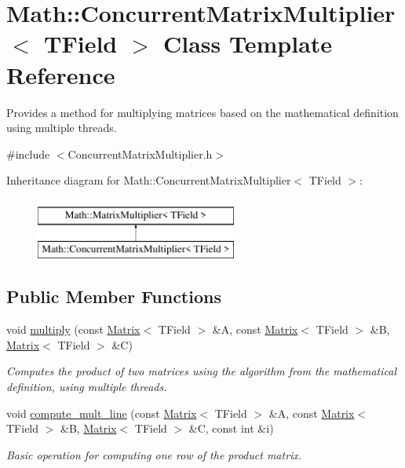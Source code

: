 \hypertarget{classMath_1_1ConcurrentMatrixMultiplier}{}\section{Math\+:\+:Concurrent\+Matrix\+Multiplier$<$ T\+Field $>$ Class Template Reference}
\label{classMath_1_1ConcurrentMatrixMultiplier}


Provides a method for multiplying matrices based on the mathematical definition using multiple threads.  




{\ttfamily \#include $<$Concurrent\+Matrix\+Multiplier.\+h$>$}

Inheritance diagram for Math\+:\+:Concurrent\+Matrix\+Multiplier$<$ T\+Field $>$\+:\begin{figure}[H]
\begin{center}
\leavevmode
\includegraphics[height=2.000000cm]{classMath_1_1ConcurrentMatrixMultiplier}
\end{center}
\end{figure}
\subsection*{Public Member Functions}
\begin{DoxyCompactItemize}
\item 
void \mbox{\hyperlink{classMath_1_1ConcurrentMatrixMultiplier_aff05c55c52bf7b9fb58b5a52d5247e7d}{multiply}} (const \mbox{\hyperlink{classMath_1_1Matrix}{Matrix}}$<$ T\+Field $>$ \&A, const \mbox{\hyperlink{classMath_1_1Matrix}{Matrix}}$<$ T\+Field $>$ \&B, \mbox{\hyperlink{classMath_1_1Matrix}{Matrix}}$<$ T\+Field $>$ \&C)
\begin{DoxyCompactList}\small\item\em Computes the product of two matrices using the algorithm from the mathematical definition, using multiple threads. \end{DoxyCompactList}\item 
void \mbox{\hyperlink{classMath_1_1ConcurrentMatrixMultiplier_ac6ab99958d957a7461819455a2114483}{compute\+\_\+mult\+\_\+line}} (const \mbox{\hyperlink{classMath_1_1Matrix}{Matrix}}$<$ T\+Field $>$ \&A, const \mbox{\hyperlink{classMath_1_1Matrix}{Matrix}}$<$ T\+Field $>$ \&B, \mbox{\hyperlink{classMath_1_1Matrix}{Matrix}}$<$ T\+Field $>$ \&C, const int \&i)
\begin{DoxyCompactList}\small\item\em Basic operation for computing one row of the product matrix. \end{DoxyCompactList}\end{DoxyCompactItemize}


